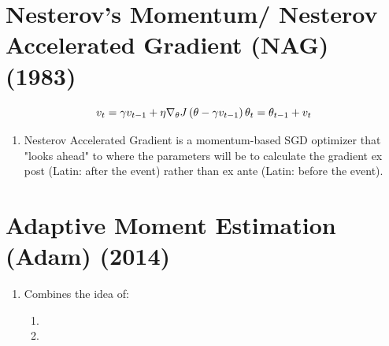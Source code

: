 \section{Nesterov’s Momentum/ Nesterov Accelerated Gradient (NAG) (1983) \cite{paperswithcode/method/nesterov-accelerated-gradient}}\label{Nesterov’s Momentum/ Nesterov Accelerated Gradient (NAG)}

\[
    v_{t} = \gamma{v}_{t-1} + \eta\nabla_{\theta}J\left(\theta-\gamma{v_{t-1}}\right)
    \hfill
    \theta_{t} = \theta_{t-1} + v_{t}
\]

\begin{enumerate}
    \item Nesterov Accelerated Gradient is a momentum-based SGD optimizer that "looks ahead" to where the parameters will be to calculate the gradient ex post (Latin: after the event) rather than ex ante (Latin: before the event).

    
\end{enumerate}




\section{Adaptive Moment Estimation (Adam) (2014) \cite{arxiv-1412.6980-adam}}\label{Adaptive Moment Estimation (Adam)}

\begin{enumerate}
    \item Combines the idea of:
    \begin{enumerate}
        \item {}
        \item {}
    \end{enumerate}
\end{enumerate}

